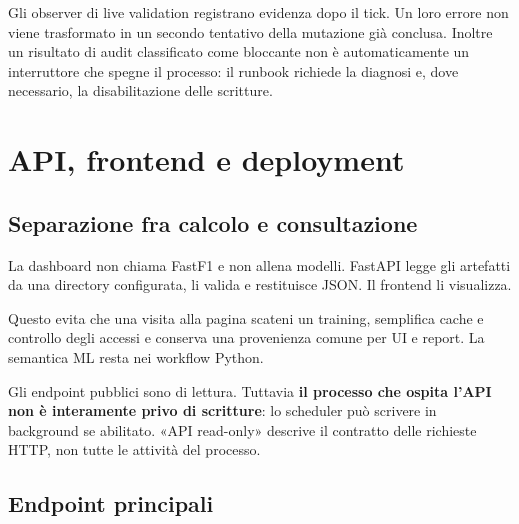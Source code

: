 \documentclass[11pt,a4paper]{article}
\begin{document}
Gli observer di live validation registrano evidenza dopo il tick. Un loro errore non viene trasformato in un secondo tentativo della mutazione già conclusa. Inoltre un risultato di audit classificato come bloccante non è automaticamente un interruttore che spegne il processo: il runbook richiede la diagnosi e, dove necessario, la disabilitazione delle scritture.

\section{API, frontend e deployment}\label{api-frontend-e-deployment}

\subsection{Separazione fra calcolo e consultazione}\label{separazione-fra-calcolo-e-consultazione}

La dashboard non chiama FastF1 e non allena modelli. FastAPI legge gli artefatti da una directory configurata, li valida e restituisce JSON. Il frontend li visualizza.

Questo evita che una visita alla pagina scateni un training, semplifica cache e controllo degli accessi e conserva una provenienza comune per UI e report. La semantica ML resta nei workflow Python.

Gli endpoint pubblici sono di lettura. Tuttavia \textbf{il processo che ospita l'API non è interamente privo di scritture}: lo scheduler può scrivere in background se abilitato. «API read-only» descrive il contratto delle richieste HTTP, non tutte le attività del processo.

\subsection{Endpoint principali}\label{endpoint-principali}
\end{document}
